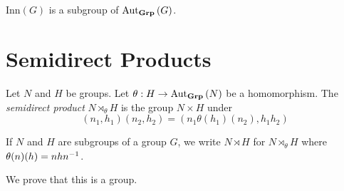 \begin{cor}
$\mathrm{Inn}(G)$ is a subgroup of $\mathrm{Aut}_{\mathbf{Grp}} \left( {G} \right)$.
\end{cor}

\section{Semidirect Products}

\begin{df}
Let $N$ and $H$ be groups. Let $\theta : H \rightarrow \mathrm{Aut}_{\mathbf{Grp}} \left( {N} \right)$ be a homomorphism. The \emph{semidirect product} $N \rtimes_\theta H$ is the group $N \times H$ under
\[ (n_1,h_1) (n_2,h_2) = (n_1 \theta(h_1)(n_2), h_1h_2) \]

If $N$ and $H$ are subgroups of a group $G$, we write $N \rtimes H$ for $N \rtimes_\theta H$ where $\theta(n)(h) = nh{n}^{-1}$.

We prove that this is a group.
\end{df}

